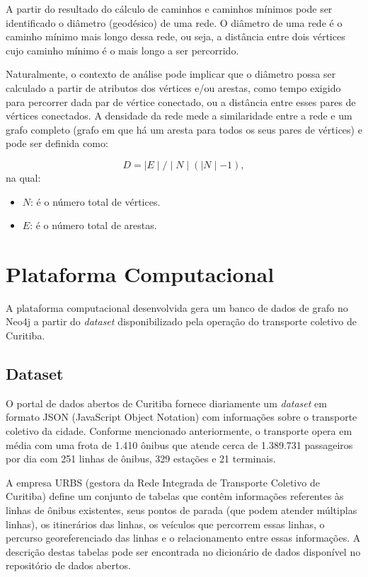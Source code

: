 A partir do resultado do cálculo de caminhos e caminhos mínimos pode ser identificado o diâmetro (geodésico) de uma rede. O diâmetro de uma rede é o caminho mínimo mais longo dessa rede, ou seja, a distância entre dois vértices cujo caminho mínimo é o mais longo a ser percorrido. 

Naturalmente, o contexto de análise pode implicar que o diâmetro possa ser calculado a partir de atributos dos vértices e/ou arestas, como tempo exigido para percorrer dada par de vértice conectado, ou a distância entre esses pares de vértices conectados.
A densidade da rede mede a similaridade entre a rede e um grafo completo (grafo em que há um aresta para todos os seus pares de vértices) e pode ser definida como:

 \begin{equation}
     D = \mid E \mid / \mid N \mid ( \mid N \mid -1),
 \end{equation} 
na qual:

 \begin{itemize}
 \item $N$: é o número total de vértices.
 \item $E$: é o número total de arestas.
\end{itemize}  


\section{Plataforma Computacional} \label{sec:impl}

A plataforma computacional desenvolvida gera um banco de dados de grafo no Neo4j a partir do \emph{dataset} disponibilizado pela operação do transporte coletivo de Curitiba.


\subsection{Dataset}

\textcolor{courb2020}{
O portal de dados abertos de Curitiba fornece diariamente um \emph{dataset} em formato JSON (JavaScript Object Notation) com informações sobre o transporte coletivo da cidade. Conforme mencionado anteriormente, o transporte opera em média com uma frota de 1.410 ônibus que atende cerca de 1.389.731 passageiros por dia com 251 linhas de ônibus, 329 estações e 21 terminais.
}

\textcolor{courb2020}{
A empresa URBS (gestora da Rede Integrada de Transporte Coletivo de Curitiba) define um conjunto de tabelas que contêm informações referentes às linhas de ônibus existentes, seus pontos de parada (que podem atender múltiplas linhas), os itinerários das linhas, os veículos que percorrem essas linhas, o percurso georeferenciado das linhas e o relacionamento entre essas informações. A descrição destas tabelas pode ser encontrada no dicionário de dados disponível no repositório de dados abertos. 
}

